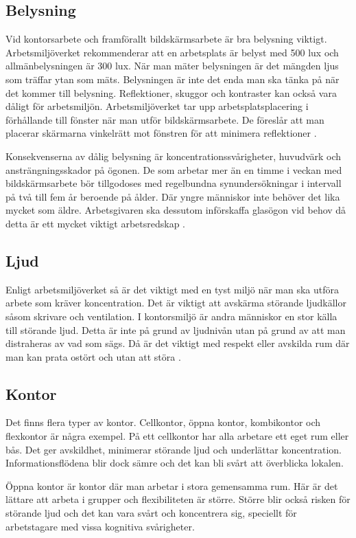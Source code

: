 \subsection{Belysning}
Vid kontorsarbete och framförallt bildskärmsarbete är bra belysning viktigt. Arbetsmiljöverket rekommenderar att en arbetsplats är belyst med 500 lux och allmänbelysningen är 300 lux. När man mäter belysningen är det mängden ljus som träffar ytan som mäts. Belysningen är inte det enda man ska tänka på när det kommer till belysning. Reflektioner, skuggor och kontraster kan också vara dåligt för arbetsmiljön. Arbetsmiljöverket tar upp arbetsplatsplacering i förhållande till fönster när man utför bildskärmsarbete. De föreslår att man placerar skärmarna vinkelrätt mot fönstren för att minimera reflektioner \cite{AVLjus}\cite{AVDator}.

Konsekvenserna av dålig belysning är koncentrationssvårigheter, huvudvärk och ansträngningsskador på ögonen. De som arbetar mer än en timme i veckan med bildskärmsarbete bör tillgodoses med regelbundna synundersökningar i intervall på två till fem år beroende på ålder. Där yngre människor inte behöver det lika mycket som äldre. Arbetsgivaren ska dessutom införskaffa glasögon vid behov då detta är ett mycket viktigt arbetsredskap \cite{AVLjus}.

\subsection{Ljud}
Enligt arbetsmiljöverket så är det viktigt med en tyst miljö när man ska utföra arbete som kräver koncentration. Det är viktigt att avskärma störande ljudkällor såsom skrivare och ventilation. I kontorsmiljö är andra människor en stor källa till störande ljud. Detta är inte på grund av ljudnivån utan på grund av att man distraheras av vad som sägs. Då är det viktigt med respekt eller avskilda rum där man kan prata ostört och utan att störa \cite{AVLjud}.

\subsection{Kontor}
Det finns flera typer av kontor. Cellkontor, öppna kontor, kombikontor och flexkontor är några exempel. På ett cellkontor har alla arbetare ett eget rum eller bås. Det ger avskildhet, minimerar störande ljud och underlättar koncentration. Informationsflödena blir dock sämre och det kan bli svårt att överblicka lokalen.

Öppna kontor är kontor där man arbetar i stora gemensamma rum. Här är det lättare att arbeta i grupper och flexibiliteten är större. Större blir också risken för störande ljud och det kan vara svårt och koncentrera sig, speciellt för arbetstagare med vissa kognitiva svårigheter.

